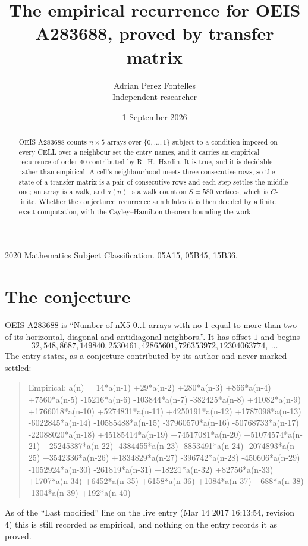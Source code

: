 \documentclass[11pt,a4paper]{article}
\title{The empirical recurrence for OEIS A283688, proved by transfer matrix}
\author{Adrian Perez Fontelles\\ \small Independent researcher}
\date{1 September 2026}
\theoremstyle{plain}
\theoremstyle{definition}
\begin{document}
\maketitle

\begin{abstract}
OEIS A283688 counts $n\times5$ arrays over $\{0,\dots,1\}$ subject to a condition imposed on
every CELL over a neighbour set the entry names, and it carries an empirical recurrence of
order $40$ contributed by R.~H.~Hardin. It is true, and it is decidable rather than
empirical. A cell's neighbourhood meets three consecutive rows, so the state of a transfer
matrix is a pair of consecutive rows and each step settles the middle one; an array is a
walk, and $a(n)$ is a walk count on $S=580$ vertices, which is $C$-finite. Whether the
conjectured recurrence annihilates it is then decided by a finite exact computation, with the
Cayley--Hamilton theorem bounding the work.
\end{abstract}

\noindent\small 2020 Mathematics Subject Classification. 05A15, 05B45, 15B36.\normalsize

\section{The conjecture}

OEIS A283688 is ``Number of nX5 0..1 arrays with no 1 equal to more than two of its horizontal, diagonal and antidiagonal neighbors.''. It has offset $1$ and begins
\[
32, 548, 8687, 149840, 2530461, 42865601, 726353972, 12304063774,\ \dots
\]
The entry states, as a conjecture contributed by its author and never marked settled:
\begin{quote}
Empirical: a(n) = 14*a(n-1) +29*a(n-2) +280*a(n-3) +866*a(n-4) +7560*a(n-5) -15216*a(n-6) -103844*a(n-7) -382425*a(n-8) +41082*a(n-9) +1766018*a(n-10) +5274831*a(n-11) +4250191*a(n-12) +1787098*a(n-13) -6022845*a(n-14) -10585488*a(n-15) -37960570*a(n-16) -50768733*a(n-17) -22088020*a(n-18) +45185414*a(n-19) +74517081*a(n-20) +51074574*a(n-21) +25245387*a(n-22) -4384455*a(n-23) -8853491*a(n-24) -2074893*a(n-25) +3542336*a(n-26) +1834829*a(n-27) -396742*a(n-28) -450606*a(n-29) -1052924*a(n-30) -261819*a(n-31) +18221*a(n-32) +82756*a(n-33) +1707*a(n-34) +6452*a(n-35) +6158*a(n-36) +1084*a(n-37) +688*a(n-38) -1304*a(n-39) +192*a(n-40)
\end{quote}
As of the ``Last modified'' line on the live entry (Mar 14 2017 16:13:54, revision 4) this is still
recorded as empirical, and nothing on the entry records it as proved.
\end{document}
